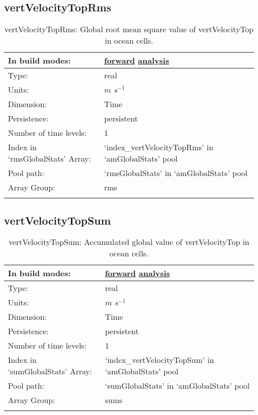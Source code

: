 \subsection[vertVelocityTopRms]{vertVelocityTopRms}
\label{subsec:var_sec_amGlobalStats_vertVelocityTopRms}
\begin{center}
\begin{longtable}{| p{2.0in} | p{4.0in} |}
        \hline 
        In build modes: & \hyperref[subsec:forward_var_tab_amGlobalStats]{forward} \hyperref[subsec:analysis_var_tab_amGlobalStats]{analysis} \\
        \hline 
        Type: & real \\
        \hline 
        Units: & $m$ $s^{-1}$ \\
        \hline 
        Dimension: & Time \\
        \hline 
        Persistence: & persistent \\
        \hline 
        Number of time levels: & 1 \\
        \hline 
		 Index in `rmsGlobalStats' Array: & `index\_vertVelocityTopRms' in `amGlobalStats' pool \\
		 \hline 
            Pool path: & `rmsGlobalStats' in `amGlobalStats' pool \\
		 \hline 
		 Array Group: & rms \\
		 \hline 
    \caption{vertVelocityTopRms: Global root mean square value of vertVelocityTop in ocean cells.}
\end{longtable}
\end{center}
\subsection[vertVelocityTopSum]{vertVelocityTopSum}
\label{subsec:var_sec_amGlobalStats_vertVelocityTopSum}
\begin{center}
\begin{longtable}{| p{2.0in} | p{4.0in} |}
        \hline 
        In build modes: & \hyperref[subsec:forward_var_tab_amGlobalStats]{forward} \hyperref[subsec:analysis_var_tab_amGlobalStats]{analysis} \\
        \hline 
        Type: & real \\
        \hline 
        Units: & $m$ $s^{-1}$ \\
        \hline 
        Dimension: & Time \\
        \hline 
        Persistence: & persistent \\
        \hline 
        Number of time levels: & 1 \\
        \hline 
		 Index in `sumGlobalStats' Array: & `index\_vertVelocityTopSum' in `amGlobalStats' pool \\
		 \hline 
            Pool path: & `sumGlobalStats' in `amGlobalStats' pool \\
		 \hline 
		 Array Group: & sums \\
		 \hline 
    \caption{vertVelocityTopSum: Accumulated global value of vertVelocityTop in ocean cells.}
\end{longtable}
\end{center}
